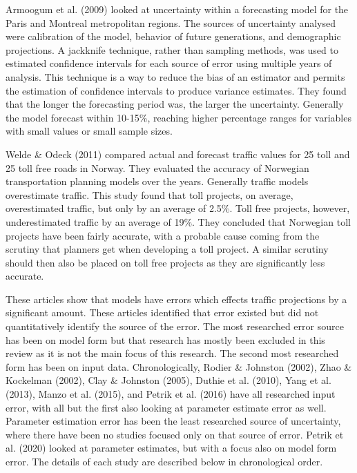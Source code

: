 \documentclass[
  letterpaper,
  authoryear,
  review,
  3p]{elsarticle}
\begin{document}
Armoogum et al. (2009) looked at uncertainty within a forecasting model
for the Paris and Montreal metropolitan regions. The sources of
uncertainty analysed were calibration of the model, behavior of future
generations, and demographic projections. A jackknife technique, rather
than sampling methods, was used to estimated confidence intervals for
each source of error using multiple years of analysis. This technique is
a way to reduce the bias of an estimator and permits the estimation of
confidence intervals to produce variance estimates. They found that the
longer the forecasting period was, the larger the uncertainty. Generally
the model forecast within 10-15\%, reaching higher percentage ranges for
variables with small values or small sample sizes.

Welde \& Odeck (2011) compared actual and forecast traffic values for 25
toll and 25 toll free roads in Norway. They evaluated the accuracy of
Norwegian transportation planning models over the years. Generally
traffic models overestimate traffic. This study found that toll
projects, on average, overestimated traffic, but only by an average of
2.5\%. Toll free projects, however, underestimated traffic by an average
of 19\%. They concluded that Norwegian toll projects have been fairly
accurate, with a probable cause coming from the scrutiny that planners
get when developing a toll project. A similar scrutiny should then also
be placed on toll free projects as they are significantly less accurate.

These articles show that models have errors which effects traffic
projections by a significant amount. These articles identified that
error existed but did not quantitatively identify the source of the
error. The most researched error source has been on model form but that
research has mostly been excluded in this review as it is not the main
focus of this research. The second most researched form has been on
input data. Chronologically, Rodier \& Johnston (2002), Zhao \&
Kockelman (2002), Clay \& Johnston (2005), Duthie et al. (2010), Yang et
al. (2013), Manzo et al. (2015), and Petrik et al. (2016) have all
researched input error, with all but the first also looking at parameter
estimate error as well. Parameter estimation error has been the least
researched source of uncertainty, where there have been no studies
focused only on that source of error. Petrik et al. (2020) looked at
parameter estimates, but with a focus also on model form error. The
details of each study are described below in chronological order.
\end{document}
